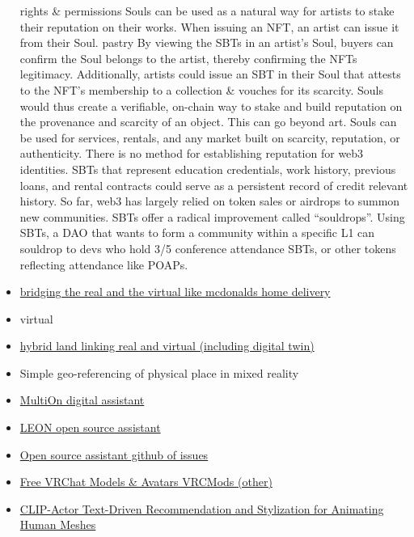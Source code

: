 \begin{itemize}
  rights \& permissions                         Souls can be used as a
  natural way for artists to stake their reputation on their works. When
  issuing an NFT, an artist can issue it from their Soul. pastry By
  viewing the SBTs in an artist's Soul, buyers can confirm the Soul
  belongs to the artist, thereby confirming the NFTs legitimacy.
  Additionally, artists could issue an SBT in their Soul that attests to
  the NFT's membership to a collection \& vouches for its scarcity.
  Souls would thus create a verifiable, on-chain way to stake and build
  reputation on the provenance and scarcity of an object. This can go
  beyond art. Souls can be used for services, rentals, and any market
  built on scarcity, reputation, or authenticity. There is no method for
  establishing reputation for web3 identities. SBTs that represent
  education credentials, work history, previous loans, and rental
  contracts could serve as a persistent record of credit relevant
  history.                                             So far, web3 has
  largely relied on token sales or airdrops to summon new communities.
  SBTs offer a radical improvement called ``souldrops''. Using SBTs, a
  DAO that wants to form a community within a specific L1 can souldrop
  to devs who hold 3/5 conference attendance SBTs, or other tokens
  reflecting attendance like POAPs.
\item
  \href{https://www.businessinsider.com/mcdonalds-metaverse-virtual-online-restaurant-trademark-delivers-food-web3-nft-2022-2}{bridging
  the real and the virtual like mcdonalds home delivery}
\item
  virtual
\item
  \href{https://labusinessjournal.com/featured/metahouse-could-be-first-of-many/}{hybrid
  land linking real and virtual (including digital twin)}
\item
  Simple geo-referencing of physical place in mixed reality
\item
  \href{https://multion.ai/}{MultiOn digital assistant}
\item
  \href{https://docs.getleon.ai/}{LEON open source assistant}
\item
  \href{https://github.com/LAION-AI/Open-Assistant/issues}{Open source
  assistant github of issues}
\item
  \href{https://vrcmods.com/}{Free VRChat Models \& Avatars \textbar{}
  VRCMods (other)}
\item
  \href{https://clip-actor.github.io/}{CLIP-Actor Text-Driven
  Recommendation and Stylization for Animating Human Meshes}

\end{itemize}
